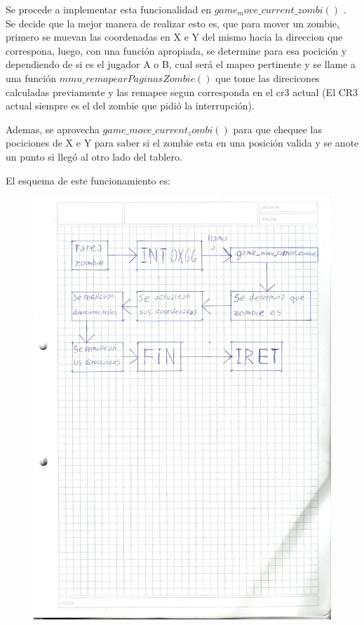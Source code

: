 \documentclass[a4paper]{article}
\begin{document}
Se procede a implementar esta funcionalidad en $game_move\_current\_zombi()$ . Se decide que la mejor manera de realizar esto es, que para mover un zombie, primero se muevan las coordenadas en X e Y del mismo hacia la direccion que correspona, luego, con una función apropiada, se determine para esa pocición y dependiendo de si es el jugador A o B, cual será el mapeo pertinente y se llame a una función $mmu\_remapearPaginasZombie()$ que tome las direcicones calculadas previamente y las remapee segun corresponda en el cr3 actual (El CR3 actual siempre es el del zombie que pidió la interrupción).

Ademas, se aprovecha $game\_move\_current_zombi()$ para que chequee las pociciones de X e Y para saber si el zombie esta en una posición valida y se anote un punto si llegó al otro lado del tablero.

El esquema de este funcionamiento es:

\begin{figure}[h!]
  \begin{center}
\includegraphics[scale=0.3]{dibujos/dibujo3.jpg}\\
  \end{center}
\end{figure}
\end{document}
